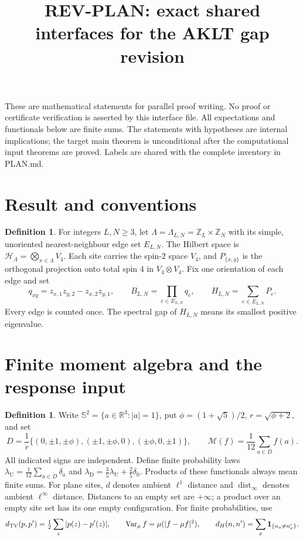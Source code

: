 \documentclass[11pt,reqno]{amsart}
\title{REV-PLAN: exact shared interfaces for the AKLT gap revision}
\date{}
\theoremstyle{definition}
\newtheorem{definition}[theorem]{Definition}
\theoremstyle{remark}
\begin{document}
\maketitle
\noindent These are mathematical statements for parallel proof writing.
No proof or certificate verification is asserted by this interface file.
All expectations and functionals below are finite sums.
The statements with hypotheses are internal implications; the target
main theorem is unconditional after the computational input theorems
are proved. Labels are shared with the complete inventory in PLAN.md.


\section{Result and conventions}

\begin{definition}\label{d:model}
For integers \(L,N\ge3\), let \(\Lambda=\Lambda_{L,N}=\mathbb Z_L\times\mathbb Z_N\)
with its simple, unoriented nearest-neighbour edge set \(E_{L,N}\).
The Hilbert space is \(\mathcal H_\Lambda=\bigotimes_{x\in\Lambda}V_4\).
Each site carries the spin-\(2\) space \(V_4\), and \(P_{\{x,y\}}\)
is the orthogonal projection onto total spin \(4\) in \(V_4\otimes V_4\).
Fix one orientation of each edge and set
\[
 q_{xy}=z_{x,1}z_{y,2}-z_{x,2}z_{y,1},\qquad
 B_{L,N}=\prod_{e\in E_{L,N}}q_e,\qquad
 H_{L,N}=\sum_{e\in E_{L,N}}P_e.
\]
Every edge is counted once. The spectral gap of \(H_{L,N}\) means its
smallest positive eigenvalue.
\end{definition}


\section{Finite moment algebra and the response input}

\begin{definition}\label{d:moment}
Write \(\mathbb S^2=\{a\in\mathbb R^3:|a|=1\}\), put
\(\phi=(1+\sqrt5)/2\), \(r=\sqrt{\phi+2}\), and set
\[
 D=\frac1r\{(0,\pm1,\pm\phi),(\pm1,\pm\phi,0),(\pm\phi,0,\pm1)\},
 \qquad
 \mathcal M(f)=\frac1{12}\sum_{a\in D}f(a).
\]
All indicated signs are independent. Define finite probability laws
\(\lambda_{\mathrm U}=\frac1{12}\sum_{a\in D}\delta_a\) and
\(\lambda_{\mathrm D}=\frac35\lambda_{\mathrm U}+\frac25\delta_0\).
Products of these functionals always mean finite sums.
For plane sites, \(d\) denotes ambient \(\ell^1\) distance and
\(\operatorname{dist}_\infty\) denotes ambient \(\ell^\infty\) distance.
Distances to an empty set are \(+\infty\); a product over an empty site
set has its one empty configuration. For finite probabilities, use
\[
 d_{\rm TV}(p,p')=\tfrac12\sum_z|p(z)-p'(z)|,\qquad
 \operatorname{Var}_\mu f=\mu(|f-\mu f|^2),\qquad
 d_H(n,n')=\sum_x\mathbf1_{\{n_x\ne n'_x\}} .
\]
\end{definition}
\end{document}
